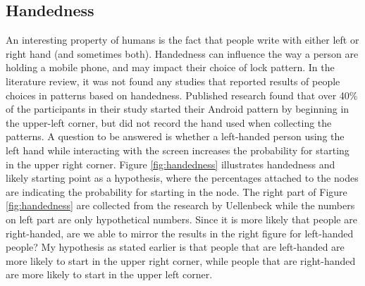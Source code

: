       \subsection*{Handedness}
      An interesting property of humans is the fact that people write with either left or right hand (and sometimes both). Handedness can influence the way a person are holding a mobile phone, and may impact their choice of lock pattern. In the literature review, it was not found any studies that reported results of people choices in patterns based on handedness. Published research \cite{Uellenbeck} found that over 40\% of the participants in their study started their Android pattern by beginning in the upper-left corner, but did not record the hand used when collecting the patterns. A question to be answered is whether a left-handed person using the left hand while interacting with the screen increases the probability for starting in the upper right corner. Figure \ref{fig:handedness} illustrates handedness and likely starting point as a hypothesis, where the percentages attached to the nodes are indicating the probability for starting in the node. The right part of Figure \ref{fig:handedness} are collected from the research by Uellenbeck \cite{Uellenbeck} while the numbers on left part are only hypothetical numbers. Since it is more likely that people are right-handed, are we able to mirror the results in the right figure for left-handed people? My hypothesis as stated earlier is that people that are left-handed are more likely to start in the upper right corner, while people that are right-handed are more likely to start in the upper left corner.

